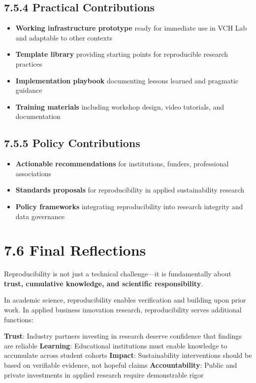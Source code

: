 \documentclass[
  oneside,
  open=any]{scrbook}
\providecommand{\tightlist}{%
  \setlength{\itemsep}{0pt}\setlength{\parskip}{0pt}}\usepackage{longtable,booktabs,array}
\begin{document}
\subsection{7.5.4 Practical
Contributions}\label{practical-contributions}

\begin{itemize}
\tightlist
\item
  \textbf{Working infrastructure prototype} ready for immediate use in
  VCH Lab and adaptable to other contexts
\item
  \textbf{Template library} providing starting points for reproducible
  research practices
\item
  \textbf{Implementation playbook} documenting lessons learned and
  pragmatic guidance
\item
  \textbf{Training materials} including workshop design, video
  tutorials, and documentation
\end{itemize}

\subsection{7.5.5 Policy Contributions}\label{policy-contributions}

\begin{itemize}
\tightlist
\item
  \textbf{Actionable recommendations} for institutions, funders,
  professional associations
\item
  \textbf{Standards proposals} for reproducibility in applied
  sustainability research
\item
  \textbf{Policy frameworks} integrating reproducibility into research
  integrity and data governance
\end{itemize}

\section{7.6 Final Reflections}\label{final-reflections}

Reproducibility is not just a technical challenge---it is fundamentally
about \textbf{trust, cumulative knowledge, and scientific
responsibility}.

In academic science, reproducibility enables verification and building
upon prior work. In applied business innovation research,
reproducibility serves additional functions:

\textbf{Trust}: Industry partners investing in research deserve
confidence that findings are reliable \textbf{Learning}: Educational
institutions must enable knowledge to accumulate across student cohorts
\textbf{Impact}: Sustainability interventions should be based on
verifiable evidence, not hopeful claims \textbf{Accountability}: Public
and private investments in applied research require demonstrable rigor
\end{document}
